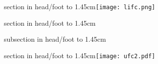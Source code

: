 {%
  \leavevmode%
  \begin{beamercolorbox}[wd=.095\paperwidth,ht=1.45cm]{section in head/foot}%
    \vbox to 1.45cm{\vfill\hspace*{1mm}\texttt{[image: lifc.png]}\vfill}%
  \end{beamercolorbox}%
  \begin{beamercolorbox}[wd=.405\paperwidth,ht=1.45cm]{section in head/foot}%
    \vbox to 1.45cm{\vfil\insertsectionnavigation{.4\paperwidth}\vfil}%
  \end{beamercolorbox}%
  \begin{beamercolorbox}[wd=.33\paperwidth,ht=1.45cm]{subsection in head/foot}%
    \vbox to 1.45cm{\vfil\insertsubsectionnavigation{.4\paperwidth}\vfil}%
  \end{beamercolorbox}%
  \begin{beamercolorbox}[wd=.17\paperwidth,ht=1.45cm]{section in head/foot}%
      \vbox to 1.45cm{\vfill\hspace*{-0.1mm}\texttt{[image: ufc2.pdf]}\vfill}%
  \end{beamercolorbox}%
}

